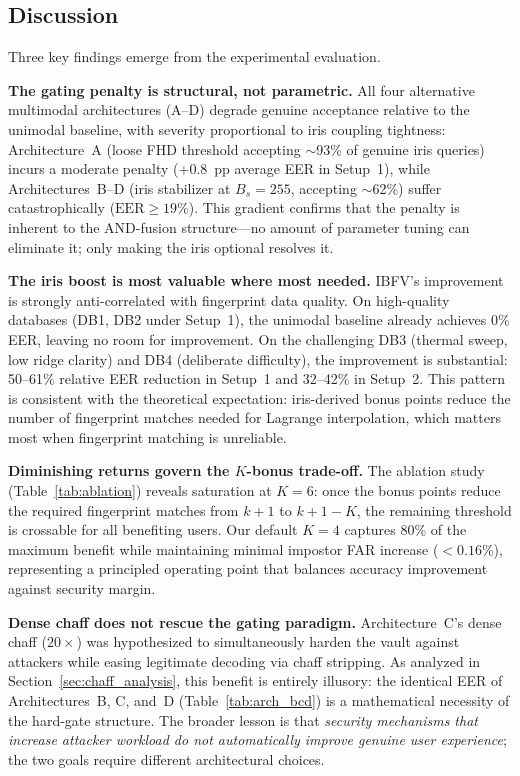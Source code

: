 \documentclass[3p,twocolumn]{elsarticle}
\newcommand{\IBFV}{\textsf{IBFV}}
\begin{document}
\subsection{Discussion}
\label{sec:discussion}

Three key findings emerge from the experimental evaluation.

\textbf{The gating penalty is structural, not parametric.} All four alternative multimodal architectures (A--D) degrade genuine acceptance relative to the unimodal baseline, with severity proportional to iris coupling tightness: Architecture~A (loose FHD threshold accepting $\sim$93\% of genuine iris queries) incurs a moderate penalty (+0.8~pp average EER in Setup~1), while Architectures~B--D (iris stabilizer at $B_s = 255$, accepting $\sim$62\%) suffer catastrophically ($\text{EER} \geq 19\%$). This gradient confirms that the penalty is inherent to the AND-fusion structure---no amount of parameter tuning can eliminate it; only making the iris optional resolves it.

\textbf{The iris boost is most valuable where most needed.} \IBFV{}'s improvement is strongly anti-correlated with fingerprint data quality. On high-quality databases (DB1, DB2 under Setup~1), the unimodal baseline already achieves 0\% EER, leaving no room for improvement. On the challenging DB3 (thermal sweep, low ridge clarity) and DB4 (deliberate difficulty), the improvement is substantial: 50--61\% relative EER reduction in Setup~1 and 32--42\% in Setup~2. This pattern is consistent with the theoretical expectation: iris-derived bonus points reduce the number of fingerprint matches needed for Lagrange interpolation, which matters most when fingerprint matching is unreliable.

\textbf{Diminishing returns govern the $K$-bonus trade-off.} The ablation study (Table~\ref{tab:ablation}) reveals saturation at $K = 6$: once the bonus points reduce the required fingerprint matches from $k+1$ to $k+1-K$, the remaining threshold is crossable for all benefiting users. Our default $K = 4$ captures 80\% of the maximum benefit while maintaining minimal impostor FAR increase ($< 0.16$\%), representing a principled operating point that balances accuracy improvement against security margin.

\textbf{Dense chaff does not rescue the gating paradigm.} Architecture~C's dense chaff ($20\times$) was hypothesized to simultaneously harden the vault against attackers while easing legitimate decoding via chaff stripping. As analyzed in Section~\ref{sec:chaff_analysis}, this benefit is entirely illusory: the identical EER of Architectures~B, C, and~D (Table~\ref{tab:arch_bcd}) is a mathematical necessity of the hard-gate structure. The broader lesson is that \emph{security mechanisms that increase attacker workload do not automatically improve genuine user experience}; the two goals require different architectural choices.
\end{document}
